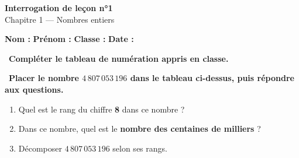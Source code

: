 \documentclass[a4paper,11pt]{article}
\newcommand{\lignepoints}{\noindent\dotfill\vspace{0.4em}\par}
\newcommand{\coeur}{\textcolor{Couleur8}{\faHeart}\ }
\begin{document}
\begin{mdframed}[linecolor=Couleur1,linewidth=2pt,topline=true,bottomline=true,
  leftline=false,rightline=false,innertopmargin=8pt,innerbottommargin=8pt,
  backgroundcolor=Couleur1!5]
\begin{center}
  {\Large\bfseries\textcolor{Couleur1}{Interrogation de leçon n°1}}\\[4pt]
  {\large\textcolor{Couleur8}{Chapitre 1 — Nombres entiers}}
\end{center}
\end{mdframed}

\vspace{0.4cm}
\noindent\textbf{Nom :} \dotfill\quad\textbf{Prénom :} \dotfill\quad
\textbf{Classe :} \dotfill\quad\textbf{Date :} \dotfill
\vspace{0.6cm}

\noindent\coeur \textbf{Compléter le tableau de numération appris en classe.}

\vspace{0.4cm}
\begin{center}
\renewcommand{\arraystretch}{1.4}
\end{center}

\vspace{0.5cm}

\noindent\coeur \textbf{Placer le nombre $4\,807\,053\,196$ dans le tableau ci-dessus, puis répondre aux questions.}


\vspace{0.4cm}
\begin{enumerate}[label=\textcolor{Couleur8}{\textbf{\arabic*.}}, leftmargin=1.5em, itemsep=0.5em]
  \item Quel est le rang du chiffre \textbf{8} dans ce nombre ? \lignepoints
  \item Dans ce nombre, quel est le \textbf{nombre des centaines de milliers} ? \lignepoints
  \item Décomposer $4\,807\,053\,196$ selon ses rangs.
  \lignepoints\lignepoints
\end{enumerate}
\end{document}
